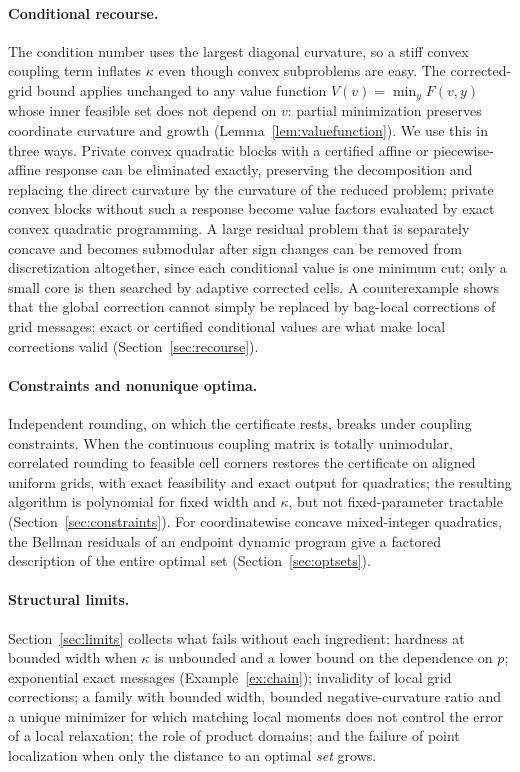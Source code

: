 \paragraph{Conditional recourse.}
The condition number uses the largest diagonal curvature, so a stiff convex
coupling term inflates $\kappa$ even though convex subproblems are easy. The
corrected-grid bound applies unchanged to any value function
$V(v)=\min_yF(v,y)$ whose inner feasible set does not depend on $v$:
partial minimization preserves coordinate curvature and growth
(Lemma~\ref{lem:valuefunction}). We use this in three ways. Private convex
quadratic blocks with a certified affine or piecewise-affine response can
be eliminated exactly, preserving the decomposition and replacing the
direct curvature by the curvature of the reduced problem; private convex
blocks without such a response become value factors evaluated by exact
convex quadratic programming. A large residual problem that is separately
concave and becomes submodular after sign changes can be removed from
discretization altogether, since each conditional value is one minimum
cut; only a small core is then searched by adaptive corrected cells. A
counterexample shows that the global correction cannot simply be replaced
by bag-local corrections of grid messages; exact or certified conditional
values are what make local corrections valid
(Section~\ref{sec:recourse}).

\paragraph{Constraints and nonunique optima.}
Independent rounding, on which the certificate rests, breaks under coupling
constraints. When the continuous coupling matrix is totally unimodular,
correlated rounding to feasible cell corners restores the certificate on
aligned uniform grids, with exact feasibility and exact output for
quadratics; the resulting algorithm is polynomial for fixed width and
$\kappa$, but not fixed-parameter tractable (Section~\ref{sec:constraints}).
For coordinatewise concave mixed-integer quadratics, the Bellman residuals
of an endpoint dynamic program give a factored description of the entire
optimal set (Section~\ref{sec:optsets}).

\paragraph{Structural limits.}
Section~\ref{sec:limits} collects what fails without each ingredient:
hardness at bounded width when $\kappa$ is unbounded and a lower bound on the
dependence on $p$; exponential exact messages (Example~\ref{ex:chain});
invalidity of local grid corrections; a family with bounded width,
bounded negative-curvature ratio and a unique minimizer for which matching
local moments does not control the error of a local relaxation; the role
of product domains; and the failure of point localization when only the
distance to an optimal \emph{set} grows.

